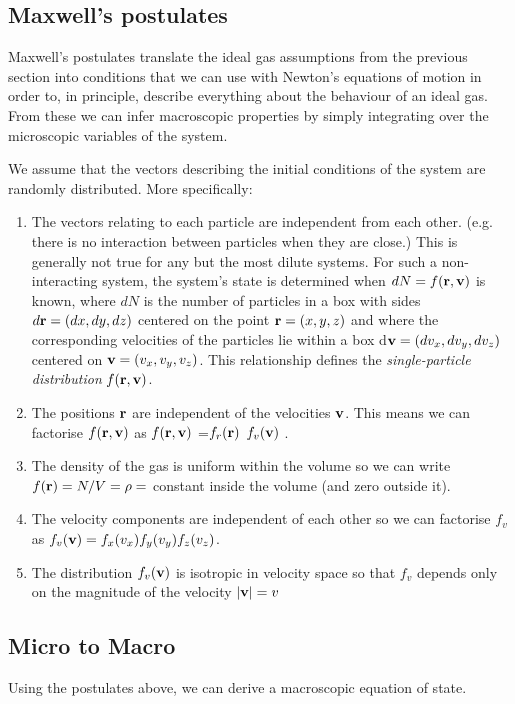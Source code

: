 \subsection{Maxwell's postulates}
Maxwell's postulates translate the ideal gas assumptions from the previous section into conditions that we can use with Newton's equations of motion in order to, in principle, describe everything about the behaviour of an ideal gas. From these we can infer macroscopic properties by simply integrating over the microscopic variables of the system.

We assume that the vectors describing the initial conditions of the system are randomly distributed. More specifically:
\begin{enumerate}
\item The vectors relating to each particle are independent from each other. (e.g. there is no interaction between particles when they are close.) This is generally not true for any but the most dilute systems. For such a non-interacting system, the system's state is determined when $dN=f({\bf r},{\bf v})$ is known, where $dN$ is the number of particles in a box with sides $d{\bf r}=(dx,dy,dz)$ centered on the point ${\bf r} = (x,y,z)$ and where the corresponding velocities of the particles lie within a box d${\bf v}=(dv_x,dv_y,dv_z)$ centered on ${\bf v}=(v_x,v_y,v_z)$. This relationship defines the \emph{single-particle distribution} $f({\bf r},{\bf v})$.
\item The positions ${\bf r}$ are independent of the velocities ${\bf v}$. This means we can factorise $f({\bf r},{\bf v})$ as $f({\bf r},{\bf v})$ =$f_r({\bf r})$ $f_v({\bf v})$ .
\item The density of the gas is uniform within the volume so we can write $f({\bf r}) = N/V=\rho=$ constant inside the volume (and zero outside it).
\item The velocity components are independent of each other so we can factorise $f_v$ as $f_v({\bf v})=f_x(v_x)f_y(v_y)f_z(v_z)$.
\item The distribution $f_v({\bf v})$ is isotropic in velocity space so that $f_v$ depends only on the magnitude of the velocity $|{\bf v}| = v$
\end{enumerate}

\subsection{Micro to Macro}
Using the postulates above, we can derive a macroscopic equation of state.

